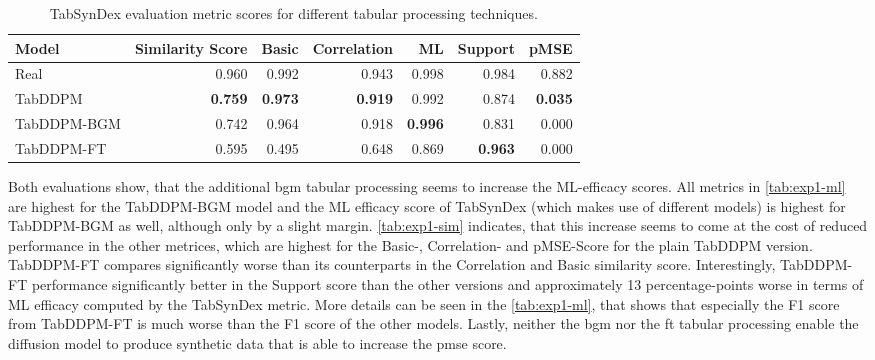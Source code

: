 \begin{table}[h]
	\centering
	\begin{tabular}{lrrrrrr}
		\toprule
		\textbf{Model} & \textbf{Similarity Score} & \textbf{Basic} & \textbf{Correlation} & \textbf{ML}    & \textbf{Support} & \textbf{pMSE}  \\
		\midrule
		Real           & 0.960                     & 0.992          & 0.943                & 0.998          & 0.984            & 0.882          \\
		TabDDPM        & \textbf{0.759}            & \textbf{0.973} & \textbf{0.919}       & 0.992          & 0.874            & \textbf{0.035} \\
		TabDDPM-BGM    & 0.742                     & 0.964          & 0.918                & \textbf{0.996} & 0.831            & 0.000          \\
		TabDDPM-FT     & 0.595                     & 0.495          & 0.648                & 0.869          & \textbf{0.963}   & 0.000          \\
		\bottomrule
	\end{tabular}
	\caption[Experiment1-Similarity]{TabSynDex evaluation metric scores for different tabular processing techniques.}
	\label{tab:exp1-sim}
\end{table}

Both evaluations show, that the additional \gls{bgm} tabular processing seems to increase the ML-efficacy scores.
All metrics in \autoref{tab:exp1-ml} are highest for the TabDDPM-BGM model and the ML efficacy score of TabSynDex (which makes use of different models)
is highest for TabDDPM-BGM as well, although only by a slight margin.
\autoref{tab:exp1-sim} indicates, that this increase seems to come at the cost of reduced performance in the other metrices, which are highest for the Basic-, Correlation- and pMSE-Score for the plain TabDDPM version.
TabDDPM-FT compares significantly worse than its counterparts in the Correlation and Basic similarity score.
Interestingly, TabDDPM-FT performance significantly better in the Support score than the other versions and approximately 13 percentage-points worse in terms of ML efficacy computed by the TabSynDex metric.
More details can be seen in the \autoref{tab:exp1-ml}, that shows that especially the F1 score from TabDDPM-FT is much worse than the F1 score of the other models.
Lastly, neither the \gls{bgm} nor the \gls{ft} tabular processing enable the diffusion model to produce synthetic data that is able to increase the \gls{pmse} score.


